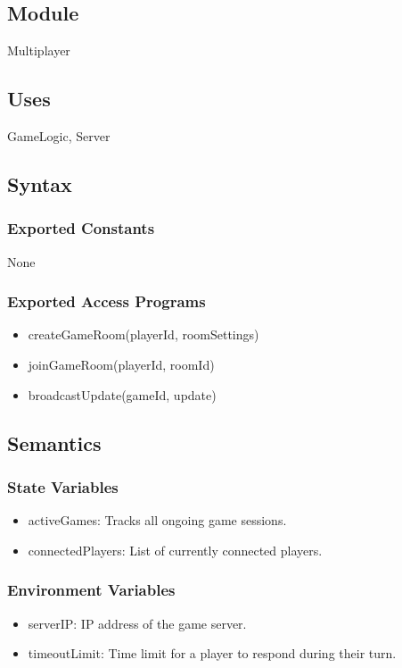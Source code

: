 \documentclass[12pt, titlepage]{article}
\begin{document}
\subsection{Module}
\hspace{1.5em}Multiplayer

\subsection{Uses}
\hspace{1.5em}GameLogic, Server

\subsection{Syntax}

\subsubsection{Exported Constants}
\hspace{1.5em}None

\subsubsection{Exported Access Programs}
\begin{itemize}
\item createGameRoom(playerId, roomSettings)
\item joinGameRoom(playerId, roomId)
\item broadcastUpdate(gameId, update)
\end{itemize}

\subsection{Semantics}

\subsubsection{State Variables}
\begin{itemize}
\item activeGames: Tracks all ongoing game sessions.
\item connectedPlayers: List of currently connected players.
\end{itemize}


\subsubsection{Environment Variables}
\begin{itemize}
\item serverIP: IP address of the game server.
\item timeoutLimit: Time limit for a player to respond during their turn.
\end{itemize}
\end{document}
